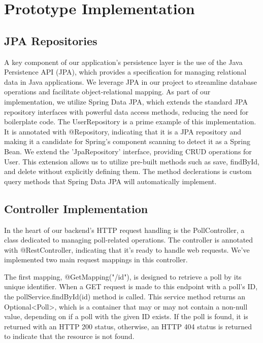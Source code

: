 \section{Prototype Implementation}
\label{sec:implementation}

\subsection{JPA Repositories}
A key component of our application's persistence layer is the use of the Java Persistence API (JPA), which provides a specification for managing relational data in Java applications. We leverage JPA in our project to streamline database operations and facilitate object-relational mapping. As part of our implementation, we utilize Spring Data JPA, which extends the standard JPA repository interfaces with powerful data access methods, reducing the need for boilerplate code.
The UserRepository is a prime example of this implementation. It is annotated with @Repository, indicating that it is a JPA repository and making it a candidate for Spring's component scanning to detect it as a Spring Bean.
We extend the 'JpaRepository' interface, providing CRUD operations for User. This extension allows us to utilize pre-built methods such as save, findById, and delete without explicitly defining them.
The method declerations is custom query methods that Spring Data JPA will automatically implement.


\subsection{Controller Implementation}
In the heart of our backend's HTTP request handling is the PollController, a class dedicated to managing poll-related operations. The controller is annotated with @RestController, indicating that it's ready to handle web requests. We've implemented two main request mappings in this controller.

The first mapping, @GetMapping("/{id}"), is designed to retrieve a poll by its unique identifier. When a GET request is made to this endpoint with a poll's ID, the pollService.findById(id) method is called. This service method returns an Optional<Poll>, which is a container that may or may not contain a non-null value, depending on if a poll with the given ID exists. If the poll is found, it is returned with an HTTP 200 status, otherwise, an HTTP 404 status is returned to indicate that the resource is not found.


